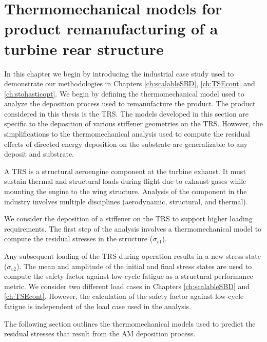 \chapter{Thermomechanical models for product remanufacturing of a turbine rear structure}
\label{ch:thermomechanical}

In this chapter we begin by introducing the industrial case study used to demonstrate our methodologies in Chapters \ref{ch:scalableSBD}, \ref{ch:TSEcont} and \ref{ch:stohasticopt}. We begin by defining the thermomechanical model used to analyze the deposition process used to remanufacture the product. The product considered in this thesis is the \ac{TRS}. The models developed in this section are specific to the deposition of various stiffener geometries on the \ac{TRS}. However, the simplifications to the thermomechanical analysis used to compute the residual effects of directed energy deposition on the substrate are generalizable to any deposit and substrate.

A \ac{TRS} is a structural aeroengine component at the turbine exhaust. It must sustain thermal and structural loads during flight due to exhaust gases while mounting the engine to the wing structure. Analysis of the component in the industry involves multiple disciplines (aerodynamic, structural, and thermal). 

We consider the deposition of a stiffener on the \ac{TRS} to support higher loading requirements. The first step of the analysis involves a thermomechanical model to compute the residual stresses in the structure ($\sigma_{v1}$). 

Any subsequent loading of the \ac{TRS} during operation results in a new stress state ($\sigma_{v2}$). The mean and amplitude of the initial and final stress states are used to compute the safety factor against low-cycle fatigue as a structural performance metric. We consider two different load cases in Chapters \ref{ch:scalableSBD} and \ref{ch:TSEcont}. However, the calculation of the safety factor against low-cycle fatigue is independent of the load case used in the analysis.

The following section outlines the thermomechanical models used to predict the residual stresses that result from the \ac{AM} deposition process.

